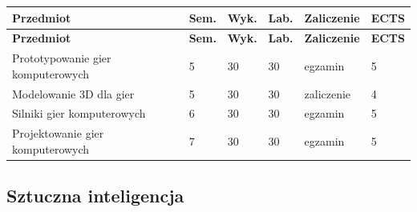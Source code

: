 \documentclass[12pt,a4paper]{article}
\newcommand{\thdrule}{\noalign{\global\setlength{\extrarowheight}{0pt}}}
\newcommand{\thdend}{\noalign{\global\setlength{\extrarowheight}{4pt}}}
\begin{document}
{\scriptsize
\begin{longtable}{m{6.5cm}m{0.7cm}m{1cm}m{1cm}m{1.7cm}m{0.7cm}}
\thdrule\toprule
\rowcolor{pjatkRed}
{\color{white}\footnotesize\textbf{\vphantom{Ag}Przedmiot}} & {\color{white}\footnotesize\textbf{\vphantom{Ag}Sem.}} & {\color{white}\footnotesize\textbf{\vphantom{Ag}Wyk.}} & {\color{white}\footnotesize\textbf{\vphantom{Ag}Lab.}} & {\color{white}\footnotesize\textbf{\vphantom{Ag}Zaliczenie}} & {\color{white}\footnotesize\textbf{\vphantom{Ag}ECTS}} \\
\midrule\thdend
\endfirsthead
\thdrule\toprule
\rowcolor{pjatkRed}
{\color{white}\footnotesize\textbf{\vphantom{Ag}Przedmiot}} & {\color{white}\footnotesize\textbf{\vphantom{Ag}Sem.}} & {\color{white}\footnotesize\textbf{\vphantom{Ag}Wyk.}} & {\color{white}\footnotesize\textbf{\vphantom{Ag}Lab.}} & {\color{white}\footnotesize\textbf{\vphantom{Ag}Zaliczenie}} & {\color{white}\footnotesize\textbf{\vphantom{Ag}ECTS}} \\
\midrule\thdend
\endhead
\rowcolor{tableRowLight} Prototypowanie gier komputerowych & 5 & 30 & 30 & {\scriptsize egzamin} & 5 \\
\rowcolor{tableRowAlt} Modelowanie 3D dla gier & 5 & 30 & 30 & {\scriptsize zaliczenie} & 4 \\
\rowcolor{tableRowLight} Silniki gier komputerowych & 6 & 30 & 30 & {\scriptsize egzamin} & 5 \\
\rowcolor{tableRowAlt} Projektowanie gier komputerowych & 7 & 30 & 30 & {\scriptsize egzamin} & 5 \\
\bottomrule
\end{longtable}}

\subsection*{Sztuczna inteligencja}
\end{document}
